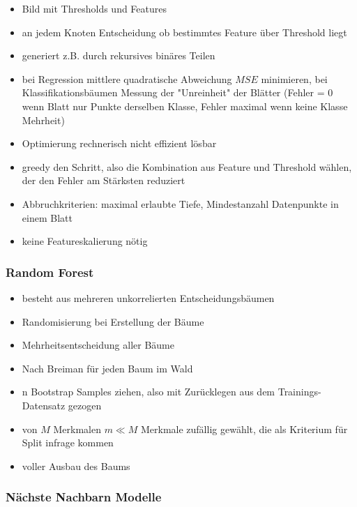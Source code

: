 		\begin{itemize}
			\item Bild mit Thresholds und Features
			\item an jedem Knoten Entscheidung ob bestimmtes Feature über Threshold liegt
			\item generiert z.B. durch rekursives binäres Teilen
			\item bei Regression mittlere quadratische Abweichung $MSE$ minimieren, bei Klassifikationsbäumen Messung der "Unreinheit" der Blätter (Fehler = 0 wenn Blatt nur Punkte derselben Klasse, Fehler maximal wenn keine Klasse Mehrheit)
			\item Optimierung rechnerisch nicht effizient lösbar
			\item greedy den Schritt, also die Kombination aus Feature und Threshold wählen, der den Fehler am Stärksten reduziert
			\item Abbruchkriterien: maximal erlaubte Tiefe, Mindestanzahl Datenpunkte in einem Blatt
			\item keine Featureskalierung nötig
		\end{itemize}
		
		\subsubsection{Random Forest}
		
		\begin{itemize}
			\item besteht aus mehreren unkorrelierten Entscheidungsbäumen
			\item Randomisierung bei Erstellung der Bäume
			\item Mehrheitsentscheidung aller Bäume
			\item Nach Breiman für jeden Baum im Wald
			\item n Bootstrap Samples ziehen, also mit Zurücklegen aus dem Trainings-Datensatz gezogen
			\item von $M$ Merkmalen $m \ll M$ Merkmale zufällig gewählt, die als Kriterium für Split infrage kommen
			\item voller Ausbau des Baums
		\end{itemize}
		
		
		\subsubsection{Nächste Nachbarn Modelle}
		
